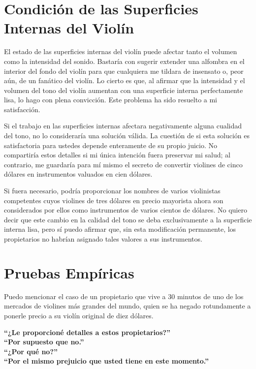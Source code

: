 \documentclass[12pt]{book}
\begin{document}
\section*{Condición de las Superficies Internas del Violín}

El estado de las superficies internas del violín puede afectar tanto el volumen como la intensidad del sonido. Bastaría con sugerir extender una alfombra en el interior del fondo del violín para que cualquiera me tildara de insensato o, peor aún, de un fanático del violín. Lo cierto es que, al afirmar que la intensidad y el volumen del tono del violín aumentan con una superficie interna perfectamente lisa, lo hago con plena convicción. Este problema ha sido resuelto a mi satisfacción. 

Si el trabajo en las superficies internas afectara negativamente alguna cualidad del tono, no lo consideraría una solución válida. La cuestión de si esta solución es satisfactoria para ustedes depende enteramente de su propio juicio. No compartiría estos detalles si mi única intención fuera preservar mi salud; al contrario, me guardaría para mí mismo el secreto de convertir violines de cinco dólares en instrumentos valuados en cien dólares. 

Si fuera necesario, podría proporcionar los nombres de varios violinistas competentes cuyos violines de tres dólares en precio mayorista ahora son considerados por ellos como instrumentos de varios cientos de dólares. No quiero decir que este cambio en la calidad del tono se deba exclusivamente a la superficie interna lisa, pero sí puedo afirmar que, sin esta modificación permanente, los propietarios no habrían asignado tales valores a sus instrumentos. 

\section*{Pruebas Empíricas}

Puedo mencionar el caso de un propietario que vive a 30 minutos de uno de los mercados de violines más grandes del mundo, quien se ha negado rotundamente a ponerle precio a su violín original de diez dólares.

\textbf{“¿Le proporcioné detalles a estos propietarios?”} \\
\textbf{“Por supuesto que no.”} \\
\textbf{“¿Por qué no?”} \\
\textbf{“Por el mismo prejuicio que usted tiene en este momento.”}
\end{document}
